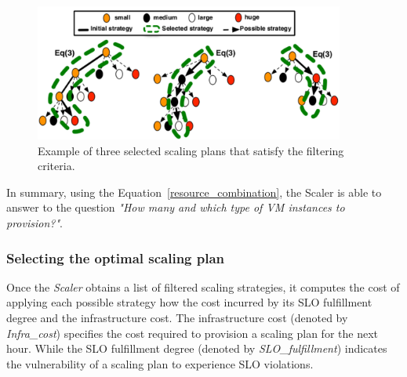 \begin{figure}[htb]
  \begin{center}
    \includegraphics[width=\linewidth,height=4.5cm]{images/optimalTree_selection}
  \end{center}
\vspace{-5mm}
  \caption{Example of three selected scaling plans that satisfy the filtering criteria.}
  \label{fig:scalingTreeSelection}
\end{figure}



In summary, using the Equation~\ref{resource_combination}, the Scaler is able to answer to the question \emph{"How many and which type of VM instances to provision?"}.


\subsubsection{Selecting the optimal scaling plan}



Once the \emph{Scaler} obtains a list of filtered scaling strategies, it computes the cost of applying each possible strategy how the cost incurred by its SLO fulfillment degree and the infrastructure cost. The infrastructure cost (denoted by \emph{Infra\_cost}) specifies the cost required to provision a scaling plan for the next hour. While the SLO fulfillment degree (denoted by \emph{SLO\_fulfillment}) indicates the vulnerability of a scaling plan to experience SLO violations. 

